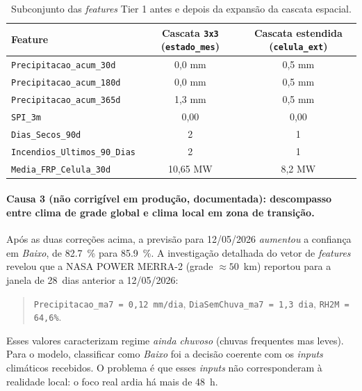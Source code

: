 \begin{table}[h]
\centering
\caption{Subconjunto das \emph{features} Tier 1 antes e depois da expansão da cascata espacial.}
\label{tab:pium_tier1_pre_pos}
\small
\begin{tabular}{lcc}
\toprule
\textbf{Feature} & \textbf{Cascata \texttt{3x3} (\texttt{estado\_mes})} & \textbf{Cascata estendida (\texttt{celula\_ext})} \\
\midrule
\texttt{Precipitacao\_acum\_30d}      & 0,0 mm  & 0,5 mm \\
\texttt{Precipitacao\_acum\_180d}     & 0,0 mm  & 0,5 mm \\
\texttt{Precipitacao\_acum\_365d}     & 1,3 mm  & 0,5 mm \\
\texttt{SPI\_3m}                       & 0,00    & 0,00 \\
\texttt{Dias\_Secos\_90d}              & 2       & 1 \\
\texttt{Incendios\_Ultimos\_90\_Dias}  & 2       & 1 \\
\texttt{Media\_FRP\_Celula\_30d}       & 10,65 MW & 8,2 MW \\
\bottomrule
\end{tabular}
\end{table}

\paragraph{Causa 3 (não corrigível em produção, documentada): descompasso entre clima de grade global e clima local em zona de transição.}

Após as duas correções acima, a previsão para 12/05/2026 \emph{aumentou} a confiança em \emph{Baixo}, de \SI{82,7}{\percent} para \SI{85,9}{\percent}. A investigação detalhada do vetor de \emph{features} revelou que a NASA POWER MERRA-2 (grade $\approx 50$~km) reportou para a janela de 28~dias anterior a 12/05/2026:

\begin{quote}
\texttt{Precipitacao\_ma7 = 0,12 mm/dia}, \texttt{DiaSemChuva\_ma7 = 1,3 dia}, \texttt{RH2M = 64,6\%}.
\end{quote}

Esses valores caracterizam regime \emph{ainda chuvoso} (chuvas frequentes mas leves). Para o modelo, classificar como \emph{Baixo} foi a decisão coerente com os \emph{inputs} climáticos recebidos. O problema é que esses \emph{inputs} não corresponderam à realidade local: o foco real ardia há mais de 48~h.

